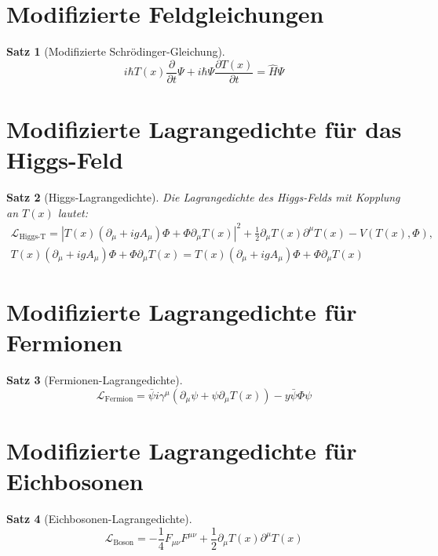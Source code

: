 \documentclass[12pt,a4paper]{article}
\newcommand{\Tfield}{T(x)}
\newcommand{\DhiggsT}{\Tfield (\partial_\mu + ig A_\mu) \Phi + \Phi \partial_\mu \Tfield}
\newtheorem{theorem}{Satz}[section]
\theoremstyle{definition}
\theoremstyle{remark}
\begin{document}
	\section{Modifizierte Feldgleichungen}
	\begin{theorem}[Modifizierte Schrödinger-Gleichung]
		\begin{equation}
			i\hbar \Tfield \frac{\partial}{\partial t} \Psi + i\hbar \Psi \frac{\partial \Tfield}{\partial t} = \hat{H} \Psi
		\end{equation}
	\end{theorem}
	
	\section{Modifizierte Lagrangedichte für das Higgs-Feld}
	\begin{theorem}[Higgs-Lagrangedichte]
		Die Lagrangedichte des Higgs-Felds mit Kopplung an \(\Tfield\) lautet:
		\begin{multline}
			\mathcal{L}_{\text{Higgs-T}} = |\DhiggsT|^2 + \frac{1}{2} \partial_\mu \Tfield \partial^\mu \Tfield - V(\Tfield, \Phi), \quad \\
			\DhiggsT = \Tfield (\partial_\mu + ig A_\mu) \Phi + \Phi \partial_\mu \Tfield
		\end{multline}
	\end{theorem}
	
	\section{Modifizierte Lagrangedichte für Fermionen}
	\begin{theorem}[Fermionen-Lagrangedichte]
		\begin{equation}
			\mathcal{L}_{\text{Fermion}} = \bar{\psi} i \gamma^\mu (\partial_\mu \psi + \psi \partial_\mu \Tfield) - y \bar{\psi} \Phi \psi
		\end{equation}
	\end{theorem}
	
	\section{Modifizierte Lagrangedichte für Eichbosonen}
	\begin{theorem}[Eichbosonen-Lagrangedichte]
		\begin{equation}
			\mathcal{L}_{\text{Boson}} = -\frac{1}{4} F_{\mu\nu} F^{\mu\nu} + \frac{1}{2} \partial_\mu \Tfield \partial^\mu \Tfield
		\end{equation}
	\end{theorem}
	
\end{document}
